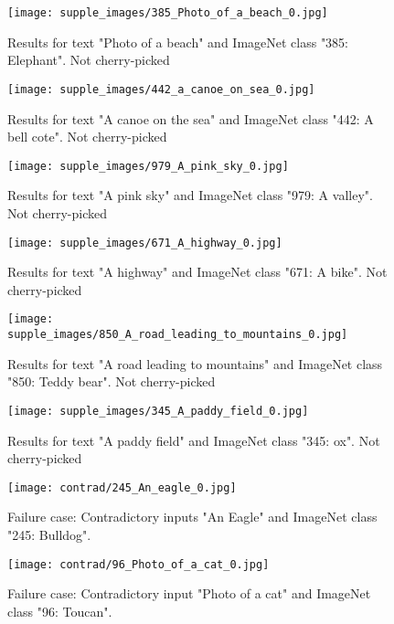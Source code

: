 \documentclass[10pt,twocolumn,letterpaper]{article}
\begin{document}
 
 \begin{figure*}[t!]
	\centering
			\texttt{[image: supple\_images/385\_Photo\_of\_a\_beach\_0.jpg]}
	\centering
	\caption{Results for text "Photo of a beach" and ImageNet class "385: Elephant". Not cherry-picked}
	\label{fig:t2im121}
	\vskip -10pt
\end{figure*}
 \begin{figure*}[t!]
	\centering
			\texttt{[image: supple\_images/442\_a\_canoe\_on\_sea\_0.jpg]}
	\centering
	\caption{Results for text "A canoe on the sea" and ImageNet class "442: A bell cote". Not cherry-picked}
	\label{fig:t2im1111}
	\vskip -10pt
\end{figure*}
 \begin{figure*}[t!]
	\centering
			\texttt{[image: supple\_images/979\_A\_pink\_sky\_0.jpg]}
	\centering
	\caption{Results for text "A pink sky" and ImageNet class "979: A valley". Not cherry-picked}
	\label{fig:t2im111}
	\vskip -10pt
\end{figure*}
 \begin{figure*}[t!]
	\centering
			\texttt{[image: supple\_images/671\_A\_highway\_0.jpg]}
	\centering
	\caption{Results for text "A highway" and ImageNet class "671: A bike". Not cherry-picked}
	\label{fig:t2im11}
	\vskip -10pt
\end{figure*}
 \begin{figure*}[t!]
	\centering
			\texttt{[image: supple\_images/850\_A\_road\_leading\_to\_mountains\_0.jpg]}
	\centering
	\caption{Results for text "A road leading to mountains" and ImageNet class "850: Teddy bear". Not cherry-picked}
	\label{fig:t2im1a}
	\vskip -10pt
\end{figure*}
 \begin{figure*}[t!]
	\centering
			\texttt{[image: supple\_images/345\_A\_paddy\_field\_0.jpg]}
	\centering

	\caption{Results for text "A paddy field" and ImageNet class "345: ox". Not cherry-picked}
	\label{fig:t2im1}
	\vskip -10pt
\end{figure*}
 \begin{figure*}[t!]
	\centering
			\texttt{[image: contrad/245\_An\_eagle\_0.jpg]}
	\centering

	\caption{Failure case: Contradictory inputs "An Eagle" and ImageNet class "245: Bulldog". }
	\label{fig:t2im1aa}
	\vskip -10pt
\end{figure*}
 \begin{figure*}[t!]
	\centering
			\texttt{[image: contrad/96\_Photo\_of\_a\_cat\_0.jpg]}
	\centering

	\caption{Failure case: Contradictory input  "Photo of a cat" and ImageNet class "96: Toucan". }
	\label{fig:t2im1ab}
	\vskip -10pt
\end{figure*}
\end{document}

